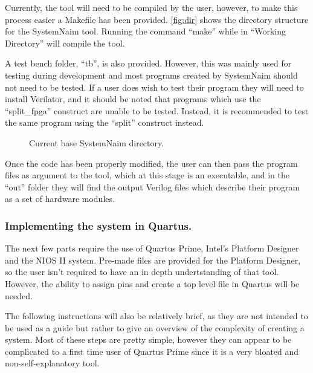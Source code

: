 Currently, the tool will need to be compiled by the user, however, to make this process easier a Makefile has been provided. \autoref{fig:dir} shows the directory structure for the SystemNaim tool. Running the command “make” while in “Working Directory” will compile the tool.

A test bench folder, “tb”, is also provided. However, this was mainly used for testing during development and most programs created by SystemNaim should not need to be tested. If a user does wish to test their program they will need to install Verilator, and it should be noted that programs which use the “split\_fpga” construct are unable to be tested. Instead, it is recommended to test the same program using the “split” construct instead.

\begin{figure}
\centering
\begin{minipage}{0.47\textwidth}
\end{minipage}
\caption{Current base SystemNaim directory.}
\label{fig:dir}
\end{figure}

Once the code has been properly modified, the user can then pass the program files as argument to the tool, which at this stage is an executable, and in the “out” folder they will find the output Verilog files which describe their program as a set of hardware modules.


\subsubsection{Implementing the system in Quartus.}

The next few parts require the use of Quartus Prime, Intel's Platform Designer and the NIOS II system. Pre-made files are provided for the Platform Designer, so the user isn't required to have an in depth undertstanding of that tool. However, the ability to assign pins and create a top level file in Quartus will be needed.

The following instructions will also be relatively brief, as they are not intended to be used as a guide but rather to give an overview of the complexity of creating a system. Most of these steps are pretty simple, however they can appear to be complicated to a first time user of Quartus Prime since it is a very bloated and non-self-explanatory tool. 


